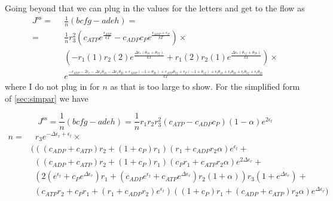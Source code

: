 \documentclass[11pt]{article}
\begin{document}
Going beyond that we can plug in the values for the letters and get to the flow as
\begin{align}
    J^\text{ss} =\enspace& \frac{1}{n}(bcfg-adeh) = \nonumber \\
    =\enspace& \frac{1}{n} r_3^{2} \left( c_{ATP} e^{\frac{\epsilon_{ATP}}{kT}} - c_{ADP} c_P e^{\frac{\epsilon_{ADP} + \epsilon_P}{kT}} \right) \times \nonumber \\
    &\left(  - r_{1}(1) r_{2}(2) e^{\frac{\Delta\epsilon_{r} \left( \theta_{1b} + \theta_{2f} \right)}{kT}} + r_{1}(2) r_{2}(1) e^{\frac{\Delta\epsilon_{r} \left( \theta_{1f} + \theta_{2b} \right)}{kT}} \right) \times \nonumber \\
    &e^{\frac{ - \epsilon_{ATP} - 2 \epsilon_{t} - \Delta\epsilon_{r} \theta_{1b} - \Delta\epsilon_{r} \theta_{2b} + \epsilon_{ADP} \left( -1 + \theta_{2b} \right) + \epsilon_{ATP} \theta_{2f} + \epsilon_P \left( -1 + \theta_{1f} \right) + \epsilon_{t} \theta_{1b} + \epsilon_{t} \theta_{2b} + \epsilon_{t} \theta_{3f} + \epsilon_{t} \theta_{3b}}{kT}} \label{eq:N1sscur}
\end{align}
where I do not plug in for $n$ as that is too large to show. For the simplified form of \cref{sec:simpar} we have
\begin{tcolorbox}
    \begin{equation}
        J^\text{ss} = \frac{1}{n}(bcfg-adeh) = \frac{1}{n}r_1r_2r_3^{2} \left( c_{ATP} - c_{ADP} c_P \right) (1 - \alpha) e^{2 \epsilon_t} \label{eq:N1sscurs}
    \end{equation}
    \begin{align}
        n =&\enspace r_3 e^{ - \Delta\epsilon_{r} + \epsilon_{t}} \times \nonumber \\
        &\big( ( ( c_{ADP} + c_{ATP} ) r_2 + ( 1 + c_P ) r_1 ) ( r_1 + c_{ADP} r_2 \alpha ) e^{\epsilon_{t}} + \nonumber \\
        &\phantom{(} ( ( c_{ADP} + c_{ATP} ) r_2 + ( 1 + c_P ) r_1 ) ( c_P r_1 + c_{ATP} r_2 \alpha ) e^{2 \Delta\epsilon_{r}} +\nonumber \\
        &\phantom{(} ( 2 ( e^{\epsilon_{t}} + c_P e^{\Delta\epsilon_{r}} ) r_1 + ( c_{ADP} e^{\epsilon_{t}} + c_{ATP} e^{\Delta\epsilon_{r}} ) r_2 ( 1 + \alpha ) ) r_3 ( 1 + e^{\Delta\epsilon_{r}} ) + \nonumber \\
        &\phantom{(} ( c_{ATP} r_2 + c_P r_1 + ( r_1 + c_{ADP} r_2 ) e^{\epsilon_{t}} ) ( ( 1 + c_P ) r_1 + ( c_{ADP} + c_{ATP} ) r_2 \alpha ) e^{\Delta\epsilon_{r}} \big)
    \end{align}
\end{tcolorbox}
\end{document}

